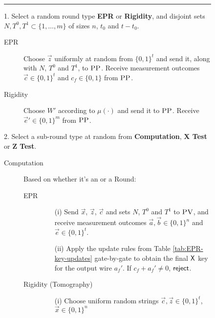\documentclass[11pt,letter]{article}
\theoremstyle{remark}
\theoremstyle{definition}
\newcommand{\pv}{\textsc{PV}}
\newcommand{\pp}{\textsc{PP}}
\newcommand{\snote}[1]{\textcolor{green}{\small {\textbf{(Stacey:} #1 \textbf{) }}}}
\begin{document}
\begin{figure}[H]
\rule[1ex]{16.5cm}{0.5pt}
\vspace{-20pt}
\justify
1. Select a random round type \textbf{EPR} or \textbf{Rigidity}, and disjoint sets $N,T^0,T^1\subset \{1,\ldots,m\}$ of sizes $n$, $t_0$ and $t-t_0$.  
\begin{description}
\item[EPR] Choose $\vec{z}$ uniformly at random from $\{0,1\}^t$ and send it, along with $N$, $T^0$ and $T^1$, to $\pp$. Receive measurement outcomes $\vec{c}\in\{0,1\}^t$ and $c_f\in\{0,1\}$ from $\pp$.
\item[Rigidity] Choose $W'$ according to $\mu(\cdot)$ and send it to $\pp$. Receive $\vec{e}'\in \{0,1\}^m$ from $\pp$. 
\end{description}
2. Select a sub-round type at random from \textbf{Computation}, \textbf{X Test} or \textbf{Z Test}. 
\begin{description}
\item[Computation] Based on whether it's an  or a  Round:
	\begin{description}
	\item[EPR]
		\begin{enumerate}
		\item[(i)] Send $\vec{x}$, $\vec{z}$, $\vec{c}$ and sets $N$, $T^0$ and $T^1$ to $\pv$, and receive measurement outcomes $\vec{a},\vec{b}\in \{0,1\}^n$ and $\vec{e}\in\{0,1\}^t$.
		\item[(ii)] Apply the update rules from Table \ref{tab:EPR-key-updates} gate-by-gate to obtain the final $\sf X$ key for the output wire $a_f'$. If $c_f+a_f'\neq 0$, $\sf reject$. %
		\end{enumerate}
	\item[Rigidity (Tomography)]
		\begin{enumerate}
		\item[(i)] Choose uniform random strings $\vec{c},\vec{z}\in\{0,1\}^t$, $\vec{x} \in \{0,1\}^n$ %

\end{enumerate}
\end{description}
\end{description}
\end{figure}
\end{document}
